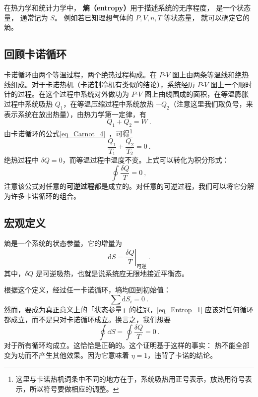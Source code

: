 
在热力学和统计力学中， \textbf{熵（entropy）}用于描述系统的无序程度， 是一个状态量， 通常记为 $S$。 例如若已知理想气体的 $P, V, n, T$ 等状态量， 就可以确定它的熵。

\subsection{回顾卡诺循环}

卡诺循环由两个等温过程，两个绝热过程构成。在 $P$-$V$ 图上由两条等温线和绝热线组成。对于卡诺热机（卡诺制冷机有类似的结论），系统经历 $P$-$V$ 图上一个顺时针的过程。在这个过程中系统对外做功为 $P$-$V$ 图上曲线围成的面积，在等温膨胀过程中系统吸热 $Q_1$，在等温压缩过程中系统放热 $-Q_2$（注意这里我们取负号，来表示系统在放出热量），由热力学第一定律，有
\begin{equation}
Q_1+Q_2=W~.
\end{equation}
由卡诺循环的公式\autoref{eq_Carnot_4}~，可得\footnote{这里与卡诺热机词条中不同的地方在于，系统吸热用正号表示，放热用符号表示，所以符号要做相应的调整。}
\begin{equation}
\frac{Q_1}{T_1}+\frac{Q_2}{T_2}=0~.
\end{equation}
绝热过程中 $\delta Q=0$，而等温过程中温度不变。上式可以转化为积分形式：
\begin{equation}
\oint \frac{\delta Q}{T}=0~,
\end{equation}
注意该公式对任意的\textbf{可逆过程}都是成立的。对任意的可逆过程，我们可以将它分解为许多卡诺循环的组合。

\subsection{宏观定义}

熵是一个系统的状态参量，它的增量为
\begin{equation}
\mathrm{d} S = \left . \frac{\delta Q}{T}\right |_{\text{可逆}}~.
\end{equation}
其中，$\delta Q$ 是可逆吸热，也就是说系统应无限地接近平衡态。

根据这个定义，经过任一卡诺循环，墒均回到初始值：
\begin{equation} \label{eq_Entrop_1}
\sum{\text{d}S_i=0}~.
\end{equation}
然而，要成为真正意义上的「状态参量」的桂冠，\autoref{eq_Entrop_1} 应该对任何循环都成立，而不是只对卡诺循环成立。换言之，我们想要
\begin{equation}
\oint \dd S =\oint \frac{\delta Q}{T}=0~.
\end{equation}
对于所有循环均成立。这恰恰是正确的。这个证明基于这样的事实： 热不能全部变为功而不产生其他效果。因为它意味着 $\eta=1$，违背了卡诺的结论。

